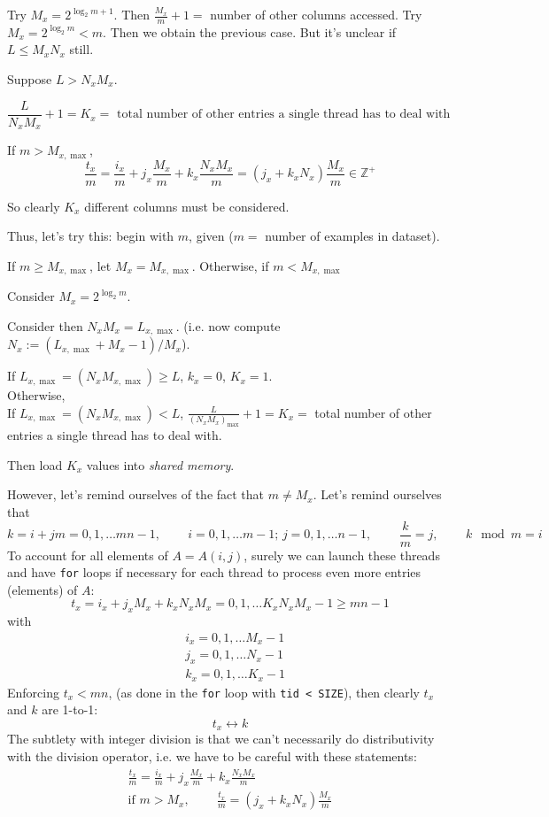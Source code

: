 \documentclass[10pt]{amsart}
\begin{document}
\begin{multicols*}{2}
Try $M_x = 2^{ \log_2{ m } +1}$.  Then $\frac{M_x}{m} +1 = $ number of other columns accessed.   Try $M_x = 2^{\log_2{m}} < m$.  Then we obtain the previous case.  But it's unclear if $L \leq M_xN_x $ still.  

Suppose $L> N_x M_x$.  

\[
\frac{L}{N_xM_x} +1 = K_x = \text{ total number of other entries a single thread has to deal with }
\]

If $m> M_{x,\max}$, 
\[
\frac{t_x}{m} = \frac{i_x}{m} + j_x \frac{M_x}{m} + k_x \frac{N_x M_x}{m} = (j_x + k_x N_x) \frac{M_x}{m} \in \mathbb{Z}^+
\]

So clearly $K_x$ different columns must be considered.  

Thus, let's try this: begin with $m$, given ($m=$ number of examples in dataset).  

If $m \geq M_{x,\max}$, let $M_x = M_{x,\max}$.  Otherwise, if $m < M_{x,\max}$  

Consider $M_x = 2^{ \log_2{m}}$.  

Consider then $N_xM_x = L_{x,\max}$.  (i.e. now compute $N_x := (L_{x,\max} + M_x-1)/ M_x$).  

If $L_{x,\max} = (N_xM_{x,\max}) \geq L$, $k_x=0$, $K_x=1$.  \\
Otherwise, \\
If $L_{x,\max} = (N_xM_{x,\max}) < L$, $\frac{ L}{ (N_xM_x)_{\max}} +1 = K_x = $ total number of other entries a single thread has to deal with.  

Then load $K_x$ values into \emph{shared memory}.  

However, let's remind ourselves of the fact that $m \neq  M_x$.  Let's remind ourselves that 
\[
k = i+jm = 0,1,\dots mn-1, \qquad \, i = 0,1,\dots m-1; \, j = 0,1 , \dots n-1 , \qquad \, \frac{k}{m} = j, \qquad \, k\mod{m} = i 
\]
To account for all elements of $A=A(i,j)$, surely we can launch these threads and have \verb|for| loops if necessary for each thread to process even more entries (elements) of $A$: 
\[
t_x = i_x + j_x M_x + k_x N_xM_x = 0,1,\dots K_xN_xM_x - 1 \geq mn -1
\]
with 
\[
\begin{aligned}
& i_x = 0,1,\dots M_x-1 \\
& j_x = 0,1,\dots N_x-1 \\
& k_x = 0,1,\dots K_x-1 
\end{aligned}\]
Enforcing $t_x < mn$, (as done in the \verb|for| loop with \verb|tid < SIZE|), then clearly $t_x$ and $k$ are 1-to-1:
\[
t_x \leftrightarrow k
\]
The subtlety with integer division is that we can't necessarily do distributivity with the division operator, i.e. we have to be careful with these statements:
\[
\begin{gathered}
\frac{t_x}{m} = \frac{i_x}{m} + j_x \frac{M_x}{m} + k_x \frac{N_x M_x}{m} \\
\text{if } m > M_x , \qquad \, \frac{t_x}{m} = (j_x + k_xN_x) \frac{M_x}{m}
\end{gathered}
\]


\end{multicols*}
\end{document}
